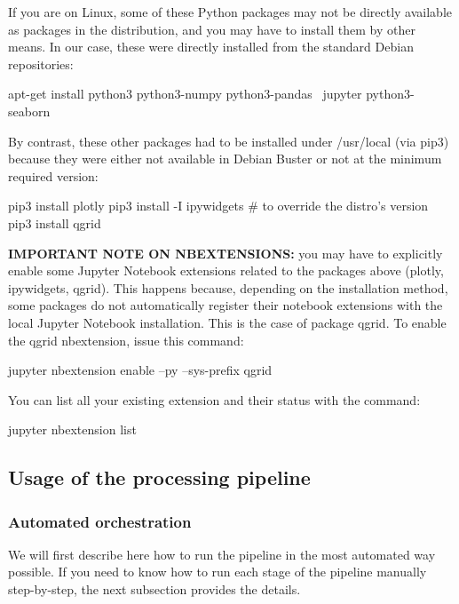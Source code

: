 \documentclass[11pt, a4paper, twoside, titlepage]{article}
\begin{document}
If you are on Linux, some of these Python packages may not be directly
available as packages in the distribution, and you may have to install
them by other means. In our case, these were directly installed from
the standard Debian repositories:
\begin{console}
  apt-get install python3 python3-numpy python3-pandas \
                 jupyter python3-seaborn
\end{console}

By contrast, these other packages had to be installed under /usr/local
(via pip3) because they were either not available in Debian Buster or
not at the minimum required version:
\begin{console}
  pip3 install plotly
  pip3 install -I ipywidgets  # to override the distro's version
  pip3 install qgrid
\end{console}

\noindent\textbf{IMPORTANT NOTE ON NBEXTENSIONS:} you may have to
explicitly enable some Jupyter Notebook extensions related to the
packages above (plotly, ipywidgets, qgrid). This happens because,
depending on the installation method, some packages do not
automatically register their notebook extensions with the local
Jupyter Notebook installation. This is the case of package qgrid. To
enable the qgrid nbextension, issue this command:
\begin{console}
  jupyter nbextension enable --py --sys-prefix qgrid
\end{console}
You can list all your existing extension and their status with the
command:
\begin{console}
  jupyter nbextension list
\end{console}



\subsection{Usage of the processing pipeline}

\subsubsection*{Automated orchestration}

We will first describe here how to run the pipeline in the most
automated way possible. If you need to know how to run each stage of
the pipeline manually step-by-step, the next subsection provides the
details.
\end{document}
